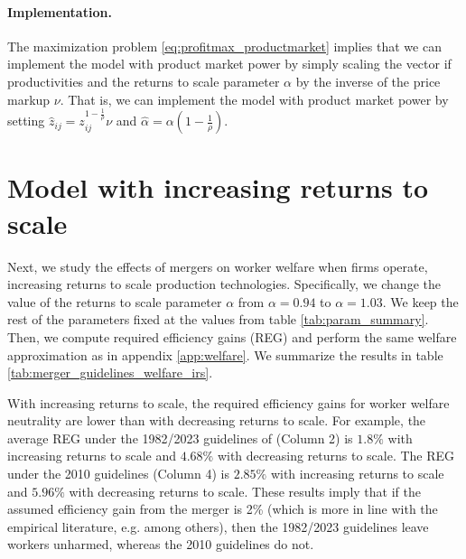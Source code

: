\documentclass[12pt]{article}
\theoremstyle{prop}
\begin{document}
\paragraph{Implementation.} 

The maximization problem \ref{eq:profitmax_productmarket} implies that we can implement the model with product market power by simply scaling the vector if productivities and the returns to scale parameter $\alpha$ by the inverse of the price markup $\nu$. That is, we can implement the model with product market power by setting $\hat{z}_{ij} = z_{ij}^{1 - \frac{1}{\rho}} \nu$ and $\hat{\alpha} = \alpha \left(1 - \frac{1}{\rho}\right)$. 

\section{Model with increasing returns to scale}
\label{app:irs}

Next, we study the effects of mergers on worker welfare when firms operate, increasing returns to scale production technologies. Specifically, we change the value of the returns to scale parameter $\alpha$ from $\alpha=0.94$ to $\alpha=1.03$. We keep the rest of the parameters fixed at the values from table \ref{tab:param_summary}. Then, we compute required efficiency gains (REG) and perform the same welfare approximation as in appendix \ref{app:welfare}. We summarize the results in table \ref{tab:merger_guidelines_welfare_irs}.

With increasing returns to scale, the required efficiency gains for worker welfare neutrality are lower than with decreasing returns to scale. For example, the average REG under the 1982/2023 guidelines of (Column 2) is $1.8\%$ with increasing returns to scale and $4.68\%$ with decreasing returns to scale. The REG under the 2010 guidelines (Column 4) is $2.85\%$ with increasing returns to scale and $5.96\%$ with decreasing returns to scale.  These results imply that if the assumed efficiency gain from the merger is 2\% (which is more in line with the empirical literature, e.g. \citet{ashenfelter2014did} among others), then the 1982/2023 guidelines leave workers unharmed, whereas the 2010 guidelines do not.

\end{document}
